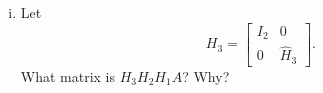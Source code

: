 \begin{pactivity}
\begin{enumerate}[i.]
\begin{comment}

\solution Let $\vx_3 = \left[ \begin{array}{r} -0.4606 \\ -1.2687 \\  -0.4222 \end{array} \right]$. Then $\sigma_3 = ||\vx_3|| = 1.4142$ and we let 
\[\vv_3 = \vx_3 - \sigma_3 \ve_1 = \left[ \begin{array}{c}  -1.8748 \\ -1.2687 \\ -0.4222 \end{array} \right].\]
From this we have the Householder matrix 
\[\hat{H}_3 = I_3 - 2\frac{\vv_3 \vv_3^{\tr}}{||\vv_3||^2}.\]
We then have 
\[\hat{H}_3\vx_3 = \left[ \begin{array}{rr} 
1.4142  \\
$0.0000$  \\
$0.0000$  
\end{array} \right].\]

\end{comment}

\item Let 
\[H_3 = \left[ \begin{array}{cc}I_2&0 \\ 0&\hat{H}_3 \end{array} \right].\]
What matrix is $H_3H_2H_1A$? Why?



\begin{comment}

\solution As with $H_2H_1A$, we have
\[ H_3H_2H_1A =  \left[ \begin{array}{rrr} 
-10.0000&-10.0000&-10.0000 \\
0.0000&1.7321&0.0000\\ 
0.0000& 0.0000&1.4142 \\
0.0000& 0.0000&0.0000\\ 
0.0000& 0.0000&0.0000
\end{array} \right].\]


\end{comment}
\end{enumerate}
\end{pactivity}
